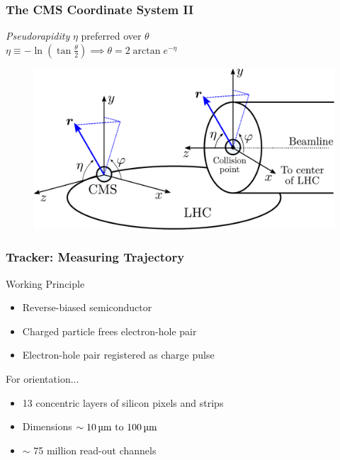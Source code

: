 \documentclass[14pt, t]{beamer}
\begin{document}
\begin{frame}
    \frametitle{The CMS Coordinate System II}

    \textit{Pseudorapidity} $ \eta $ preferred over $ \theta $\\
    \null \quad $ \displaystyle{\eta \equiv - \ln \left( \tan \frac{\theta}{2} \right) \implies \theta = 2 \arctan e^{- \eta}} $
    \vspace{-6mm}
    \begin{figure}[htb!]
        \centering
        \includegraphics[width=0.9\linewidth]{vector/figures-presentation/cms-coordinate-system.pdf}
    \end{figure}
    
\end{frame}

\begin{frame}
   \frametitle{Tracker: Measuring Trajectory}
    
    Working Principle
    \begin{itemize}

     	\item Reverse-biased semiconductor\\
        \item Charged particle frees electron-hole pair\\
        \item Electron-hole pair registered as charge pulse

    \end{itemize}
    \vspace{5mm}

    \pause
    For orientation...
    \begin{itemize}
    
        \item 13 concentric layers of silicon pixels and strips 

        \item Dimensions $ \sim \text{\SIrange{10}{100}{\micro \meter}} $

        \item $ \sim $ 75 million read-out channels

    \end{itemize}
    
\end{frame}
\end{document}
